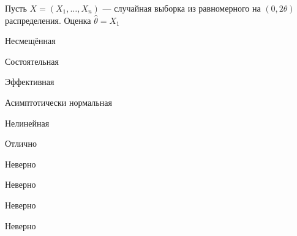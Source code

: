 
\begin{question}
Пусть \(X = (X_1, \ldots , X_n)\) --- случайная выборка из равномерного
на \((0, 2\theta)\) распределения. Оценка \(\hat{\theta} = X_1\)
\begin{answerlist}
  \item Несмещённая
  \item Состоятельная
  \item Эффективная
  \item Асимптотически нормальная
  \item Нелинейная
\end{answerlist}
\end{question}

\begin{solution}
\begin{answerlist}
  \item Отлично
  \item Неверно
  \item Неверно
  \item Неверно
  \item Неверно
\end{answerlist}
\end{solution}

